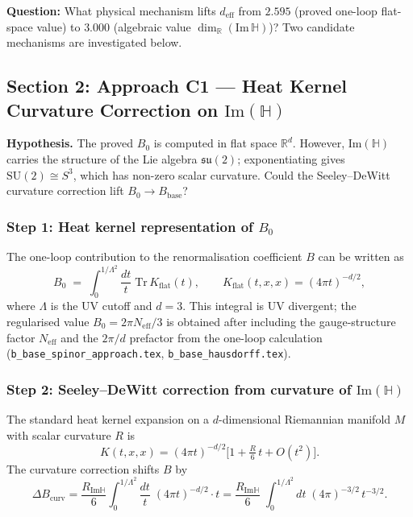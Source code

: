 \documentclass[11pt,a4paper]{article}
\theoremstyle{definition}
\theoremstyle{remark}
\begin{document}
\textbf{Question:} What physical mechanism lifts $d_{\mathrm{eff}}$ from $2.595$
(proved one-loop flat-space value) to $3.000$
(algebraic value $\dim_\mathbb{R}(\mathrm{Im}\,\mathbb{H})$)?
Two candidate mechanisms are investigated below.

\subsection{Section 2: Approach C1 — Heat Kernel Curvature Correction on $\mathrm{Im}(\mathbb{H})$}
\label{sec:C1_curvature}

\textbf{Hypothesis.}
The proved $B_0$ is computed in flat space $\mathbb{R}^d$.
However, $\mathrm{Im}(\mathbb{H})$ carries the structure of the Lie algebra
$\mathfrak{su}(2)$; exponentiating gives $\mathrm{SU}(2) \cong S^3$, which has
non-zero scalar curvature.
Could the Seeley--DeWitt curvature correction lift $B_0 \to B_{\mathrm{base}}$?

\subsubsection{Step 1: Heat kernel representation of $B_0$}

The one-loop contribution to the renormalisation coefficient $B$ can be written as
\begin{equation}
  B_0 \;=\; \int_0^{1/\Lambda^2} \frac{dt}{t}\;
           \mathrm{Tr}\,K_{\mathrm{flat}}(t),
  \qquad
  K_{\mathrm{flat}}(t,x,x) = (4\pi t)^{-d/2},
  \label{eq:B0_heatkernel}
\end{equation}
where $\Lambda$ is the UV cutoff and $d = 3$.
This integral is UV divergent; the regularised value $B_0 = 2\pi N_{\mathrm{eff}}/3$
is obtained after including the gauge-structure factor $N_{\mathrm{eff}}$ and the
$2\pi/d$ prefactor from the one-loop calculation
(\texttt{b\_base\_spinor\_approach.tex}, \texttt{b\_base\_hausdorff.tex}).

\subsubsection{Step 2: Seeley--DeWitt correction from curvature of $\mathrm{Im}(\mathbb{H})$}

The standard heat kernel expansion on a $d$-dimensional Riemannian manifold $M$
with scalar curvature $R$ is
\begin{equation}
  K(t,x,x)
    = (4\pi t)^{-d/2}\bigl[1 + \tfrac{R}{6}\,t + O(t^2)\bigr].
  \label{eq:seeley_dewitt}
\end{equation}
The curvature correction shifts $B$ by
\begin{equation}
  \Delta B_{\mathrm{curv}}
    = \frac{R_{\mathrm{Im}\mathbb{H}}}{6}
      \int_0^{1/\Lambda^2} \frac{dt}{t}\;(4\pi t)^{-d/2}\cdot t
    = \frac{R_{\mathrm{Im}\mathbb{H}}}{6}\;
      \int_0^{1/\Lambda^2} dt\;(4\pi)^{-3/2}\,t^{-3/2}.
  \label{eq:DeltaB_curv}
\end{equation}
\end{document}
